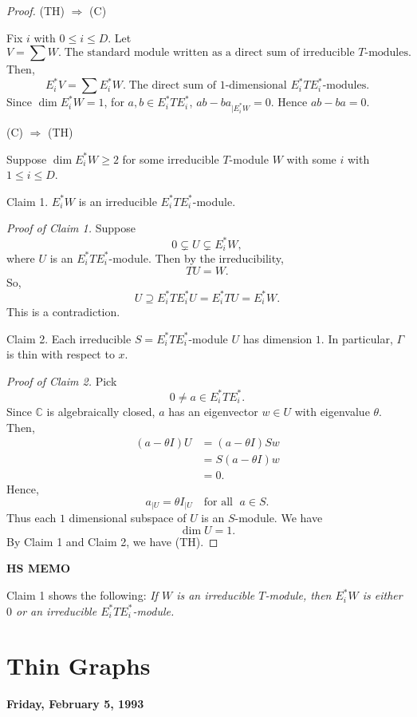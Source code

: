 \documentclass[
]{book}
\theoremstyle{definition}
\theoremstyle{definition}
\theoremstyle{definition}
\theoremstyle{definition}
\theoremstyle{remark}
\begin{document}
\begin{proof}
\leavevmode

(TH) \(\Rightarrow\) (C)

Fix \(i\) with \(0\leq i\leq D\). Let
\[V = \sum W. \; \text{The standard module written as a direct sum of irreducible $T$-modules}.\]
Then,
\[E_i^*V = \sum E_i^*W. \; \text{The direct sum of 1-dimensional $E_i^*TE_i^*$-modules}.\]
Since \(\dim E_i^*W = 1\), for \(a, b\in E_i^*TE_i^*\), \({ab - ba}_{| E_i^*W} = 0\). Hence \(ab - ba = 0\).

(C) \(\Rightarrow\) (TH)

Suppose \(\dim E_i^*W \geq 2\) for some irreducible \(T\)-module \(W\) with some \(i\) with \(1\leq i\leq D\).

Claim 1. \(E_i^*W\) is an irreducible \(E_i^*TE_i^*\)-module.

\emph{Proof of Claim 1.}
Suppose
\[0 \subsetneq U \subsetneq E_i^*W,\]
where \(U\) is an \(E_i^*TE_i^*\)-module. Then by the irreducibility,
\[TU = W.\]
So,
\[U \supseteq E_i^*TE_i^*U = E_i^*TU = E^*_iW.\]
This is a contradiction.

Claim 2. Each irreducible \(S = E_i^*TE_i^*\)-module \(U\) has dimension \(1\). In particular, \(\Gamma\) is thin with respect to \(x\).

\emph{Proof of Claim 2.}
Pick
\[0\neq a \in E_i^*TE_i^*.\]
Since \(\mathbb{C}\) is algebraically closed, \(a\) has an eigenvector \(w\in U\) with eigenvalue \(\theta\). Then,
\begin{align}
(a- \theta I)U & = (a-\theta I)Sw\\
& = S(a-\theta I)w\\
& = 0.
\end{align}
Hence,
\[a_{|U} = \theta I_{|U} \quad \text{for all }\; a\in S.\]
Thus each \(1\) dimensional subspace of \(U\) is an \(S\)-module. We have
\[\dim U = 1.\]
By Claim 1 and Claim 2, we have (TH).

\end{proof}

\textbf{HS MEMO}

Claim 1 shows the following: \emph{If \(W\) is an irreducible \(T\)-module, then \(E^*_iW\) is either \(0\) or an irreducible \(E^*_iTE^*_i\)-module.}

\hypertarget{lec8}{%
\chapter{Thin Graphs}\label{lec8}}

\textbf{Friday, February 5, 1993}
\end{document}
